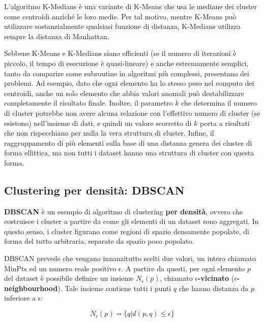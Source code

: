 \documentclass[a4paper, 12pt]{report}
\begin{document}
				L'algoritmo K-Medians è una variante di K-Means che usa le mediane dei
				cluster come centroidi anziché le loro medie. Per tal motivo, mentre
				K-Means può utilizzare sostanzialmente qualsiasi funzione di distanza,
				K-Medians utilizza sempre la distanza di Manhattan.

				Sebbene K-Means e K-Medians siano efficienti (se il numero di
				iterazioni è piccolo, il tempo di esecuzione è quasi-lineare) e
				anche estremamente semplici, tanto da comparire come subroutine
				in algoritmi più complessi, presentano dei problemi. Ad esempio,
				dato che ogni elemento ha lo stesso peso nel computo dei centroidi,
				anche un solo elemento che abbia valori anomali può destabilizzare
				completamente il risultato finale. Inoltre, il parametro $k$ che
				determina il numero di cluster potrebbe non avere alcuna relazione
				con l'effettivo numero di cluster (se esistono) nell'insieme di
				dati, e quindi un valore scorretto di $k$ porta a risultati che
				non rispecchiano per nulla la vera struttura di cluster. Infine,
				il raggruppamento di più elementi sulla base di una distanza genera
				dei cluster di forma ellittica, ma non tutti i dataset hanno una
				struttura di cluster con questa forma.

			\subsection{Clustering per densità: DBSCAN}

				\textbf{DBSCAN} è un esempio di algoritmo di clustering \textbf{per
				densità}, ovvero che costruisce i cluster a partire da come gli
				elementi di un dataset sono aggregati. In questo senso, i cluster
				figurano come regioni di spazio densamente popolate, di forma del
				tutto arbitraria, separate da spazio poco popolato.

				DBSCAN prevede che vengano innanzitutto scelti due valori, un intero
				chiamato MinPts ed un numero reale positivo $\epsilon$. A partire da
				questi, per ogni elemento $p$ del dataset è possibile definire un
				insieme $N_{\epsilon}(p)$, chiamato $\epsilon$\textbf{-vicinato}
				($\epsilon$\textbf{-neighbourhood}). Tale insieme contiene tutti i
				punti $q$ che hanno distanza da $p$ inferiore a $\epsilon$:

				\begin{equation*}
					N_{\epsilon} (p) = \{q | d(p, q) \leq \epsilon\}
				\end{equation*}
\end{document}
